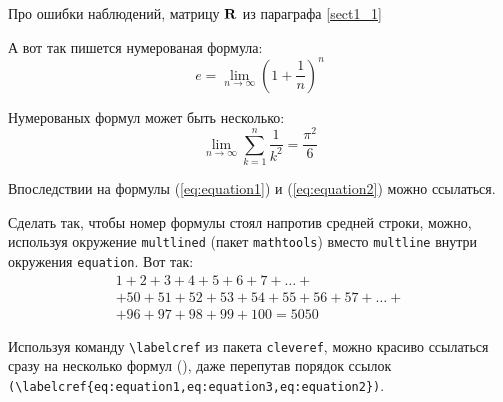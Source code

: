 Про ошибки наблюдений, матрицу $ \mathbf{R} $ из параграфа \ref{sect1_1}

А вот так пишется нумерованая формула:
\begin{equation}
  \label{eq:equation1}
  e = \lim_{n \to \infty} \left( 1+\frac{1}{n} \right) ^n
\end{equation}

Нумерованых формул может быть несколько:
\begin{equation}
  \label{eq:equation2}
  \lim_{n \to \infty} \sum_{k=1}^n \frac{1}{k^2} = \frac{\pi^2}{6}
\end{equation}

Впоследствии на формулы (\ref{eq:equation1}) и (\ref{eq:equation2}) можно ссылаться.

Сделать так, чтобы номер формулы стоял напротив средней строки, можно, используя окружение \verb|multlined| (пакет \verb|mathtools|) вместо \verb|multline| внутри окружения \verb|equation|. Вот так:
\begin{equation} %
  \label{eq:equation3}
    \begin{multlined}
        1+ 2+3+4+5+6+7+\dots + \\ 
        + 50+51+52+53+54+55+56+57 + \dots + \\ 
        + 96+97+98+99+100=5050 
    \end{multlined}
\end{equation}

Используя команду \verb|\labelcref| из пакета \verb|cleveref|, можно
красиво ссылаться сразу на несколько формул
(), даже перепутав
порядок ссылок \verb|(\labelcref{eq:equation1,eq:equation3,eq:equation2})|.
